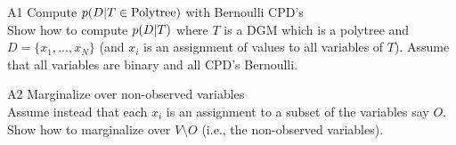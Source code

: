 \documentclass[a4paper,twoside=false,abstract=false,numbers=noenddot,
titlepage=false,headings=small,parskip=half,version=last]{scrartcl}
\begin{document}

\begin{exercise}{A1} Compute $p{(D|T\in{\text{Polytree}})}$ with Bernoulli
    CPD's \\
    Show how to compute $p{(D|T)}$ where $T$ is a DGM which is a polytree and
    $D = \{x_1,...,x_N\}$ (and $x_i$ is an assignment of values to all
    variables of $T$).
    Assume that all variables are binary and all CPD's Bernoulli.
\end{exercise}
\begin{solution}

\end{solution}

\begin{exercise}{A2} Marginalize over non-observed variables \\
    Assume instead that each $x_i$ is an assignment to a subset of the
    variables say $O$.
    Show how to marginalize over $V\setminus O$ (i.e., the non-observed
    variables).
\end{exercise}
\begin{solution}

\end{solution}
\end{document}
